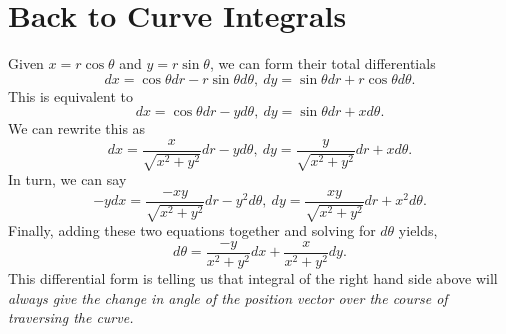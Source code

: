 \documentclass{article}
\begin{document}
\section*{Back to Curve Integrals}
Given $x = r\cos\theta$ and $y = r\sin\theta$, we can form their total differentials
\[dx = \cos\theta dr - r \sin\theta d\theta,\ dy = \sin\theta dr + r\cos\theta d\theta.\]
This is equivalent to 
\[dx = \cos\theta dr - yd\theta,\ dy = \sin\theta dr + x d\theta.\]
We can rewrite this as 
\[dx = \frac{x}{\sqrt{x^2+y^2}}dr - yd\theta,\ dy = \frac{y}{\sqrt{x^2+y^2}}dr + x d\theta.\]
In turn, we can say
\[-ydx = \frac{-xy}{\sqrt{x^2+y^2}}dr - y^2d\theta,\ dy = \frac{xy}{\sqrt{x^2+y^2}}dr + x^2 d\theta.\]
Finally, adding these two equations together and solving for $d\theta$ yields,
\[d\theta = \frac{-y}{x^2+y^2}dx + \frac{x}{x^2+y^2}dy. \]
This differential form is telling us that integral of the right hand side above will \emph{always give the change in angle
of the position vector over the course of traversing the curve.}
\end{document}
